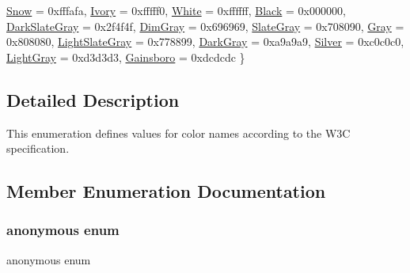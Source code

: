 \begin{DoxyCompactItemize}
\hyperlink{classastu_1_1WebColors_ac75482e858498b1b3fa521ba93fcda98a0a171195cae509bb300f3b96a14d41eb}{Snow} = 0xfffafa, 
\newline
\hyperlink{classastu_1_1WebColors_ac75482e858498b1b3fa521ba93fcda98a3ed6e32f169dd5a6d870b5aa4abea718}{Ivory} = 0xfffff0, 
\hyperlink{classastu_1_1WebColors_ac75482e858498b1b3fa521ba93fcda98acc916d617a3ce8d3e4b9716bbdc231e5}{White} = 0xffffff, 
\hyperlink{classastu_1_1WebColors_ac75482e858498b1b3fa521ba93fcda98a915454255bdc03ff9d0fadee51ba3d50}{Black} = 0x000000, 
\hyperlink{classastu_1_1WebColors_ac75482e858498b1b3fa521ba93fcda98a7ed2c9b9d58a6c73954ec57794fd7919}{Dark\+Slate\+Gray} = 0x2f4f4f, 
\newline
\hyperlink{classastu_1_1WebColors_ac75482e858498b1b3fa521ba93fcda98ad2e409351a56f050db4d3f5cbb05ab2e}{Dim\+Gray} = 0x696969, 
\hyperlink{classastu_1_1WebColors_ac75482e858498b1b3fa521ba93fcda98a512374117f09cd3b5650ab8ca7d59fb5}{Slate\+Gray} = 0x708090, 
\hyperlink{classastu_1_1WebColors_ac75482e858498b1b3fa521ba93fcda98add07bc347ec478e93387a904d0fe9b58}{Gray} = 0x808080, 
\hyperlink{classastu_1_1WebColors_ac75482e858498b1b3fa521ba93fcda98a781d8618d3c490e12df99d81b4918a95}{Light\+Slate\+Gray} = 0x778899, 
\newline
\hyperlink{classastu_1_1WebColors_ac75482e858498b1b3fa521ba93fcda98a52069d6d08fc012170c9f5c512ddd31a}{Dark\+Gray} = 0xa9a9a9, 
\hyperlink{classastu_1_1WebColors_ac75482e858498b1b3fa521ba93fcda98ad9a2476cee96f1b846f98e28ff5560cb}{Silver} = 0xc0c0c0, 
\hyperlink{classastu_1_1WebColors_ac75482e858498b1b3fa521ba93fcda98a95de5edbe2354b1911cc77f87b39b645}{Light\+Gray} = 0xd3d3d3, 
\hyperlink{classastu_1_1WebColors_ac75482e858498b1b3fa521ba93fcda98a7b4825bab2c426069a459e56b78a6465}{Gainsboro} = 0xdcdcdc
 \}
\end{DoxyCompactItemize}


\subsection{Detailed Description}
This enumeration defines values for color names according to the W3C specification. 

\subsection{Member Enumeration Documentation}
\mbox{\label{classastu_1_1WebColors_ac75482e858498b1b3fa521ba93fcda98}} 
\subsubsection{\texorpdfstring{anonymous enum}{anonymous enum}}
{\footnotesize\ttfamily anonymous enum}

